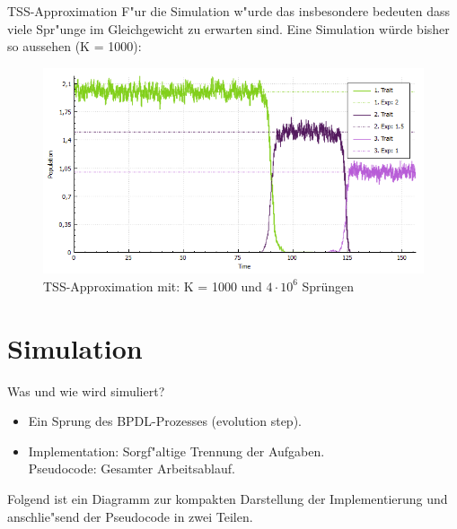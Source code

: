 \documentclass{beamer}
\begin{document}
\begin{frame}{TSS-Approximation}
	F"ur die Simulation w"urde das insbesondere bedeuten dass viele Spr"unge im Gleichgewicht zu erwarten sind.\pause
	Eine Simulation würde bisher so aussehen (K = 1000):
	\begin{figure}[H]
		\centering
		\includegraphics[width=0.8\linewidth]{./Pictures/TSS2_pure_small}
		\caption[TSS Approximation wechselnder Dominanz]{TSS-Approximation mit: K = 1000 und $ 4 \cdot 10^6 $ Sprüngen}
	\end{figure}
\end{frame}

\section{Simulation}
\begin{frame}{Was und wie wird simuliert?}
	\begin{itemize}\pause
		\item Ein Sprung des BPDL-Prozesses (evolution step).\pause
		\item Implementation: Sorgf"altige Trennung der Aufgaben.\\
			Pseudocode: Gesamter Arbeitsablauf.\pause
	\end{itemize}
	Folgend ist ein Diagramm zur kompakten Darstellung der Implementierung und anschlie"send der Pseudocode in zwei Teilen.
\end{frame}
\end{document}
